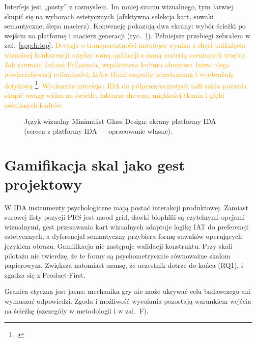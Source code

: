 Interfejs jest „pusty” z rozmysłem. Im mniej szumu wizualnego, tym łatwiej skupić się na wyborach estetycznych (afektywna selekcja kart, suwaki semantyczne, ślepa macierz). Konwencję pokazują dwa ekrany: wybór ścieżki po wejściu na platformę i macierz generacji (ryc.~\ref{fig:ch07:ui-screens}). Pełniejsze przebiegi zebrałem w zał.~\ref{app:h:top}. \textcolor{orange}{Decyzja o transparentności interfejsu wynika z chęci uniknięcia wizualnej konkurencji między ramą aplikacji a samą materią ocenianych wnętrz. Jak zauważa Juhani Pallasmaa, współczesna kultura obrazowa łatwo ulega powierzchownej retinalności, która tłumi empatię przestrzenną i wyobraźnię dotykową \footcite{pallasmaa2012oczy}. Wyciszenie interfejsu IDA do półprzezroczystych tafli szkła pozwala skupić uwagę widza na świetle, fakturze drewna, miękkości tkanin i głębi ocenianych kadrów.}

\begin{figure}[htbp]
  \centering
  \caption{Język wizualny Minimalist Glass Design: ekrany platformy IDA (screen z platformy IDA --- opracowanie własne).}
  \label{fig:ch07:ui-screens}
\end{figure}

\section{Gamifikacja skal jako gest projektowy}
\label{ch07:sec:gamifikacja}

W IDA instrumenty psychologiczne mają postać interakcji produktowej. Zamiast surowej listy pozycji PRS jest mood grid, dawki biophilii są czytelnymi opcjami wizualnymi, gest przesuwania kart wizualnych adaptuje logikę IAT do preferencji estetycznych, a dyferencjał semantyczny przybiera formę suwaków operujących językiem obrazu.
Gamifikacja nie zastępuje walidacji konstruktu. Przy skali pilotażu nie twierdzę, że te formy są psychometrycznie równoważne skalom papierowym. Zwiększa natomiast szansę, że uczestnik dotrze do końca (RQ1), i zgadza się z Product-First.

Granica etyczna jest jasna: mechanika gry nie może ukrywać celu badawczego ani wymuszać odpowiedzi. Zgoda i możliwość wycofania pozostają warunkiem wejścia na ścieżkę (szczegóły w metodologii i w zał.~F).

